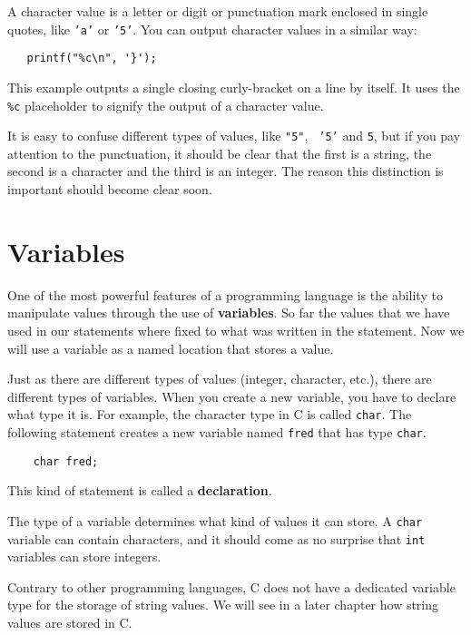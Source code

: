A character value is a letter or digit or punctuation mark
enclosed in single quotes, like {\tt 'a'} or {\tt '5'}.
You can output character values in a similar way:

\begin{verbatim}
   printf("%c\n", '}');
\end{verbatim}
%
This example outputs a single closing curly-bracket on a line
by itself. It uses the {\tt \%c} placeholder to signify the output of a character
value.

It is easy to confuse different types of values, like {\tt "5"}, {\tt
'5'} and {\tt 5}, but if you pay attention to the punctuation, it
should be clear that the first is a string, the second is a character
and the third is an integer.  The reason this distinction is important
should become clear soon.

\section {Variables}

One of the most powerful features of a programming language is the
ability to manipulate values through the use of {\bf variables}.  So far
the values that we have used in our statements where fixed to what 
was written in the statement. Now we will use a variable as a named 
location that stores a value.  

Just as there are different types of values (integer, character,
etc.), there are different types of variables.  When you create a new
variable, you have to declare what type it is.  For example, the
character type in C is called {\tt char}.  The following statement
creates a new variable named {\tt fred} that has type {\tt char}.

\begin{verbatim}
    char fred;
\end{verbatim}
%
This kind of statement is called a {\bf declaration}.

The type of a variable determines what kind of values it can
store.  A {\tt char} variable can contain characters, and it should
come as no surprise that {\tt int} variables can store integers.

Contrary to other programming languages, C does not have a 
dedicated variable type for the storage of string values. We will see in
a later chapter how string values are stored in C. 

